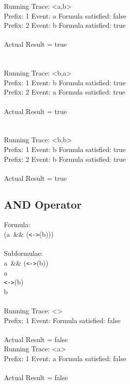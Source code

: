 \noindent Running Trace: \textless a,b\textgreater\\
  Prefix: 1 Event: a Formula satisfied: false\\
  Prefix: 2 Event: b Formula satisfied: true\\
\\
Actual Result = true\\
\\
\\
\noindent Running Trace: \textless b,a\textgreater\\
  Prefix: 1 Event: b Formula satisfied: true\\
  Prefix: 2 Event: a Formula satisfied: true\\
\\
Actual Result = true\\
\\
\\
Running Trace: \textless b,b\textgreater\\
  Prefix: 1 Event: b Formula satisfied: true\\
  Prefix: 2 Event: b Formula satisfied: true\\
\\
Actual Result = true\\

\subsection{AND Operator}

Formula:\\
(a\ \&\& (\texttt{<->}(b)))\\
\\
Subformulae:\\
a\ \&\& (\texttt{<->}(b))\\
a\\
\texttt{<->}(b)\\
b\\
\\
Running Trace: \textless \textgreater\\
  Prefix: 1 Event:  Formula satisfied: false\\
\\
Actual Result = false\\

\noindent Running Trace: \textless a\textgreater\\
  Prefix: 1 Event: a Formula satisfied: false\\
\\
Actual Result = false\\

